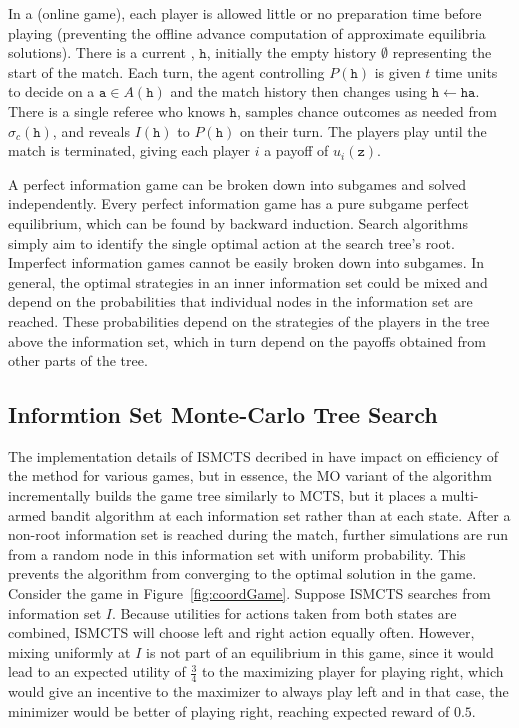 \documentclass[letterpaper]{article}
\newcommand{\tta}{\mathtt{a}}
\newcommand{\tth}{\mathtt{h}}
\newcommand{\ttz}{\mathtt{z}}
\newcommand{\defword}[1]{\textbf{\boldmath{#1}}}
\begin{document}
In a \defword{match} (online game), each player is allowed little or no preparation time before playing (preventing the offline advance computation of approximate equilibria solutions).
There is a current \defword{match history}, $\tth$, initially the empty history $\emptyset$ representing the start of the match. Each turn, 
the agent controlling $P(\tth)$ is given $t$ time units to decide on a \defword{match action} $\tta \in A(\tth)$ and the 
match history then changes using $\tth \leftarrow \tth \tta$. There is a single referee who knows $\tth$, samples chance outcomes 
as needed from $\sigma_c(\tth)$, and reveals $I(\tth)$ to $P(\tth)$ on their turn. The players play until the match is terminated, 
giving each player $i$ a payoff of $u_i(\ttz)$.


A perfect information game can be broken down into subgames and solved independently. 
Every perfect information game has a pure subgame perfect equilibrium, which can be found by backward induction. 
Search algorithms simply aim to identify the single optimal action at the search tree's root. 
Imperfect information games cannot be easily broken down into subgames. In general, the optimal strategies in an inner 
information set could be mixed and depend on the probabilities that individual nodes in the information set are 
reached. These probabilities depend on the strategies of the players in the tree above the information set, which in 
turn depend on the payoffs obtained from other parts of the tree. 


\subsection{Informtion Set Monte-Carlo Tree Search}

The implementation details of ISMCTS decribed in \cite{Cowling12ISMCTS} have impact on efficiency of the method for various games, but in essence, the MO variant of the algorithm incrementally builds the game tree similarly to MCTS, but it places a multi-armed bandit algorithm at each information set rather than at each state. After a non-root information set is reached during the match, further simulations are run from a random node in this information set with uniform probability. This prevents the algorithm from converging to the optimal solution in the game.
Consider the game in Figure~\ref{fig:coordGame}.
Suppose ISMCTS searches from information set $I$. Because utilities for actions taken from both states are combined, ISMCTS will choose left and right action equally often. However, mixing uniformly at $I$ is not part of an equilibrium in this game, since it would lead to an expected utility of $\frac{3}{4}$ to the maximizing player for playing right, which would give an incentive to the maximizer to always play left and in that case, the minimizer would be better of playing right, reaching expected reward of $0.5$.
\end{document}
